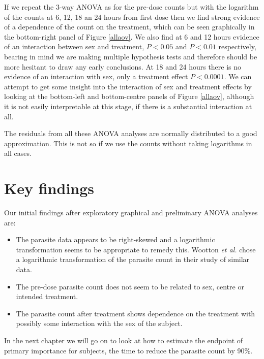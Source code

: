 If we repeat the 3-way ANOVA as for the pre-dose counts but with the logarithm of the counts at 6, 12, 18 an 24 hours from first dose then we find strong evidence of a dependence of the count on the treatment, which can be seen graphically in the bottom-right panel of Figure \ref{allaov}. We also find at 6 and 12 hours evidence of an interaction between sex and treatment, $P<0.05$ and $P<0.01$ respectively, bearing in mind we are making multiple hypothesis tests and therefore should be more hesitant to draw any early conclusions. At 18 and 24 hours there is no evidence of an interaction with sex, only a treatment effect $P<0.0001$. We can attempt to get some insight into the interaction of sex and treatment effects by looking at the bottom-left and bottom-centre panels of Figure \ref{allaov}, although it is not easily interpretable at this stage, if there is a substantial interaction at all.

The residuals from all these ANOVA analyses are normally distributed to a good approximation. This is not so if we use the counts without taking logarithms in all cases.
\section{Key findings}
Our initial findings after exploratory graphical and preliminary ANOVA analyses are:
\begin{itemize}
\item The parasite data appears to be right-skewed and a logarithmic transformation seems to be appropriate to remedy this. Wootton \textit{et al.}\cite{wootton} chose a logarithmic transformation of the parasite count in their study of similar data.
\item The pre-dose parasite count does not seem to be related to sex, centre or intended treatment.
\item The parasite count after treatment shows dependence on the treatment with possibly some interaction with the sex of the subject.
\end{itemize}

In the next chapter we will go on to look at how to estimate the endpoint of primary importance for subjects, the time to reduce the parasite count by 90\%.